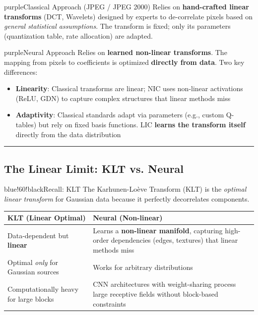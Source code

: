 \begin{calloutbox}{purple}{Classical Approach (JPEG / JPEG 2000)}
Relies on \textbf{hand-crafted linear transforms} (DCT, Wavelets) designed by experts to de-correlate pixels based on \textit{general statistical assumptions}. The transform is fixed; only its parameters (quantization table, rate allocation) are adapted.
\end{calloutbox}

\begin{calloutbox}{purple}{Neural Approach}
Relies on \textbf{learned non-linear transforms}. The mapping from pixels to coefficients is optimized \textbf{directly from data}. Two key differences:

\begin{itemize}
\item \textbf{Linearity}: Classical transforms are linear; NIC uses non-linear activations (ReLU, GDN) to capture complex structures that linear methods miss
\item \textbf{Adaptivity}: Classical standards adapt via parameters (e.g., custom Q-tables) but rely on fixed basis functions. LIC \textbf{learns the transform itself} directly from the data distribution
\end{itemize}
\end{calloutbox}

\bigskip\hrule\bigskip

\subsection{The Linear Limit: KLT vs. Neural}

\begin{calloutbox}{blue!60!black}{Recall: KLT}
The Karhunen-Loève Transform (KLT) is the \textit{optimal linear transform} for Gaussian data because it perfectly decorrelates components.
\end{calloutbox}

\begin{center}
\begin{tabular}{|l|l|}
\hline
\textbf{KLT (Linear Optimal)} & \textbf{Neural (Non-linear)} \\ \hline
Data-dependent but \textbf{linear} & Learns a \textbf{non-linear manifold}, capturing high-order dependencies (edges, textures) that linear methods miss \\ \hline
Optimal \textit{only} for Gaussian sources & Works for arbitrary distributions \\ \hline
Computationally heavy for large blocks & CNN architectures with weight-sharing process large receptive fields without block-based constraints \\ \hline
\end{tabular}
\end{center}

